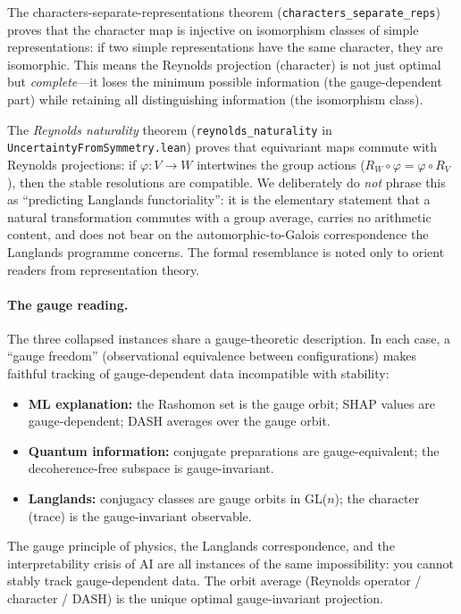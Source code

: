 \documentclass[11pt,a4paper]{article}
\begin{document}
The characters-separate-representations theorem (\texttt{characters\_separate\_reps}) proves that the character map is injective on isomorphism classes of simple representations: if two simple representations have the same character, they are isomorphic.  This means the Reynolds projection (character) is not just optimal but \emph{complete}---it loses the minimum possible information (the gauge-dependent part) while retaining all distinguishing information (the isomorphism class).

The \emph{Reynolds naturality} theorem (\texttt{reynolds\_naturality} in \texttt{Uncertainty\allowbreak FromSymmetry.lean}) proves that equivariant maps commute with Reynolds projections: if $\varphi : V \to W$ intertwines the group actions ($R_W \circ \varphi = \varphi \circ R_V$), then the stable resolutions are compatible.  We deliberately do \emph{not} phrase this as ``predicting Langlands functoriality'': it is the elementary statement that a natural transformation commutes with a group average, carries no arithmetic content, and does not bear on the automorphic-to-Galois correspondence the Langlands programme concerns.  The formal resemblance is noted only to orient readers from representation theory.

\paragraph{The gauge reading.}
The three collapsed instances share a gauge-theoretic description.  In each case, a ``gauge freedom'' (observational equivalence between configurations) makes faithful tracking of gauge-dependent data incompatible with stability:
\begin{itemize}
  \item \textbf{ML explanation:} the Rashomon set is the gauge orbit; SHAP values are gauge-dependent; DASH averages over the gauge orbit.
  \item \textbf{Quantum information:} conjugate preparations are gauge-equivalent; the decoherence-free subspace is gauge-invariant.
  \item \textbf{Langlands:} conjugacy classes are gauge orbits in GL($n$); the character (trace) is the gauge-invariant observable.
\end{itemize}
The gauge principle of physics, the Langlands correspondence, and the interpretability crisis of AI are all instances of the same impossibility: you cannot stably track gauge-dependent data.  The orbit average (Reynolds operator / character / DASH) is the unique optimal gauge-invariant projection.
\end{document}
